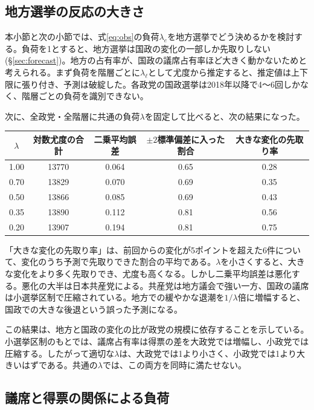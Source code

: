 \documentclass[a4paper,11pt]{ltjsarticle}
\begin{document}
\subsection{地方選挙の反応の大きさ}
\label{sec:loading}

本小節と次の小節では、式\eqref{eq:obs}の負荷$\lambda_e$を地方選挙でどう決めるかを検討する。負荷を1とすると、地方選挙は国政の変化の一部しか先取りしない(\S\ref{sec:forecast})。地方の占有率が、国政の議席占有率ほど大きく動かないためと考えられる。まず負荷を階層ごとに$\lambda_\ell$として尤度から推定すると、推定値は上下限に張り付き、予測は破綻した。各政党の国政選挙は2018年以降で4〜6回しかなく、階層ごとの負荷を識別できない。

次に、全政党・全階層に共通の負荷$\lambda$を固定して比べると、次の結果になった。

\begin{table}[h]
\centering
\begin{tabular}{ccccc}
\hline
$\lambda$ & 対数尤度の合計 & 二乗平均誤差 & $\pm2$標準偏差に入った割合 & 大きな変化の先取り率 \\
\hline
1.00 & 13770 & 0.064 & 0.65 & 0.28 \\
0.70 & 13829 & 0.070 & 0.69 & 0.35 \\
0.50 & 13866 & 0.085 & 0.69 & 0.43 \\
0.35 & 13890 & 0.112 & 0.81 & 0.56 \\
0.20 & 13907 & 0.194 & 0.81 & 0.75 \\
\hline
\end{tabular}
\end{table}

「大きな変化の先取り率」は、前回からの変化が5ポイントを超えた6件について、変化のうち予測で先取りできた割合の平均である。$\lambda$を小さくすると、大きな変化をより多く先取りでき、尤度も高くなる。しかし二乗平均誤差は悪化する。悪化の大半は日本共産党による。共産党は地方議会で強い一方、国政の議席は小選挙区制で圧縮されている。地方での緩やかな退潮を$1/\lambda$倍に増幅すると、国政での大きな後退という誤った予測になる。

この結果は、地方と国政の変化の比が政党の規模に依存することを示している。小選挙区制のもとでは、議席占有率は得票の差を大政党では増幅し、小政党では圧縮する。したがって適切な$\lambda$は、大政党では1より小さく、小政党では1より大きいはずである。共通の$\lambda$では、この両方を同時に満たせない。

\subsection{議席と得票の関係による負荷}
\label{sec:seatvote}
\end{document}
